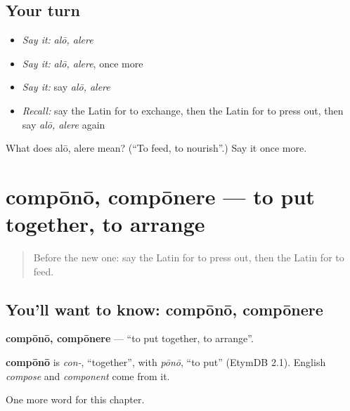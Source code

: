 \subsection*{Your turn}
\begin{itemize}
\raggedright
  \item \emph{Say it:} \emph{alō, alere}
  \item \emph{Say it:} \emph{alō, alere}, once more
  \item \emph{Say it:} say \emph{alō, alere}
  \item \emph{Recall:} say the Latin for to exchange, then the Latin for to press out, then say \emph{alō, alere} again
\end{itemize}

\begin{tcolorbox}[breakable,colback=teal!4,colframe=teal!35!black,title={Before you move on}]
What does alō, alere mean? (\textquotedblleft{}To feed, to nourish\textquotedblright{}.) Say it once more.
\end{tcolorbox}
\section[compōnō, compōnere]{compōnō, compōnere — to put together, to arrange}

\label{lesson:LA-C260-compono}



\begin{quote}
Before the new one: say the Latin for to press out, then the Latin for to feed.
\end{quote}

\subsection*{You'll want to know: compōnō, compōnere}
\textbf{compōnō, compōnere} — \textquotedblleft{}to put together, to arrange\textquotedblright{}.

\begin{cousinweb}
\textbf{compōnō} is \emph{con-}, \textquotedblleft{}together\textquotedblright{}, with \emph{pōnō}, \textquotedblleft{}to put\textquotedblright{} (EtymDB 2.1). English \emph{compose} and \emph{component} come from it.
\end{cousinweb}

\begin{grammarlens}[title={What you've built}]
One more word for this chapter.
\end{grammarlens}

